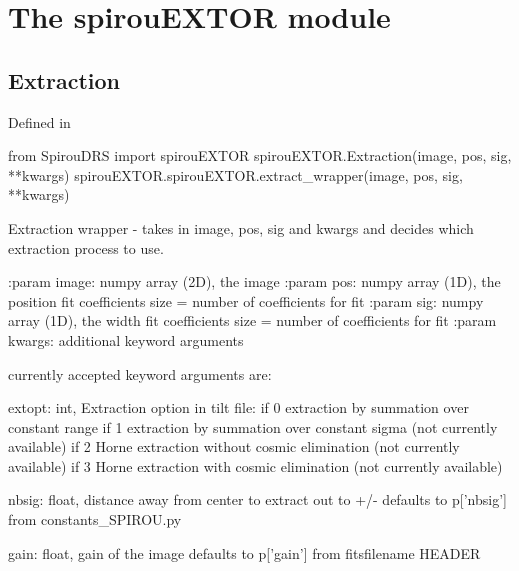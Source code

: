 
\clearpage
\newpage
\noindent\begin{minipage}{\textwidth}
\section{The spirouEXTOR module}
\label{ch:the_module:spirouEXTOR}

\subsection{Extraction}

Defined in \spirouEXTOR{}

\begin{pythonbox}
from SpirouDRS import spirouEXTOR
spirouEXTOR.Extraction(image, pos, sig, **kwargs)
spirouEXTOR.spirouEXTOR.extract_wrapper(image, pos, sig, **kwargs)
\end{pythonbox}

\begin{pythondocstring}
Extraction wrapper - takes in image, pos, sig and kwargs and decides
which extraction process to use.

:param image: numpy array (2D), the image
:param pos: numpy array (1D), the position fit coefficients
            size = number of coefficients for fit
:param sig: numpy array (1D), the width fit coefficients
            size = number of coefficients for fit
:param kwargs: additional keyword arguments

currently accepted keyword arguments are:

    extopt:         int, Extraction option in tilt file:
                     if 0 extraction by summation over constant range
                     if 1 extraction by summation over constant sigma
                        (not currently available)
                     if 2 Horne extraction without cosmic elimination
                        (not currently available)
                     if 3 Horne extraction with cosmic elimination
                        (not currently available)

    nbsig:          float,  distance away from center to extract out to +/-
                    defaults to p['nbsig'] from constants_SPIROU.py

    gain:           float, gain of the image
                    defaults to p['gain'] from fitsfilename HEADER


\end{pythondocstring}
\end{minipage}
